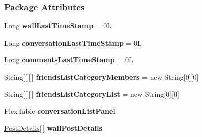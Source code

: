 \subsubsection*{Package Attributes}
\begin{DoxyCompactItemize}
\item 
\hypertarget{classballmerpeak_1_1turtlenet_1_1client_1_1frontend_a0ae0ed364ab749ea18cf1e45d64e1db7}{Long {\bfseries wall\-Last\-Time\-Stamp} = 0\-L}\label{classballmerpeak_1_1turtlenet_1_1client_1_1frontend_a0ae0ed364ab749ea18cf1e45d64e1db7}

\item 
\hypertarget{classballmerpeak_1_1turtlenet_1_1client_1_1frontend_a97ea23587c248a189f579102c29a0fc9}{Long {\bfseries conversation\-Last\-Time\-Stamp} = 0\-L}\label{classballmerpeak_1_1turtlenet_1_1client_1_1frontend_a97ea23587c248a189f579102c29a0fc9}

\item 
\hypertarget{classballmerpeak_1_1turtlenet_1_1client_1_1frontend_a7a4a64b5a06ff541b6a7112f852833b3}{Long {\bfseries comments\-Last\-Time\-Stamp} = 0\-L}\label{classballmerpeak_1_1turtlenet_1_1client_1_1frontend_a7a4a64b5a06ff541b6a7112f852833b3}

\item 
\hypertarget{classballmerpeak_1_1turtlenet_1_1client_1_1frontend_a5f5b375a148f003db1813758020730d6}{String\mbox{[}$\,$\mbox{]}\mbox{[}$\,$\mbox{]} {\bfseries friends\-List\-Category\-Members} = new String\mbox{[}0\mbox{]}\mbox{[}0\mbox{]}}\label{classballmerpeak_1_1turtlenet_1_1client_1_1frontend_a5f5b375a148f003db1813758020730d6}

\item 
\hypertarget{classballmerpeak_1_1turtlenet_1_1client_1_1frontend_af616e8f4d9c96bac48b8f997004cc385}{String\mbox{[}$\,$\mbox{]}\mbox{[}$\,$\mbox{]} {\bfseries friends\-List\-Category\-List} = new String\mbox{[}0\mbox{]}\mbox{[}0\mbox{]}}\label{classballmerpeak_1_1turtlenet_1_1client_1_1frontend_af616e8f4d9c96bac48b8f997004cc385}

\item 
\hypertarget{classballmerpeak_1_1turtlenet_1_1client_1_1frontend_ad41191c45ac70b949585a24904a7f83a}{Flex\-Table {\bfseries conversation\-List\-Panel}}\label{classballmerpeak_1_1turtlenet_1_1client_1_1frontend_ad41191c45ac70b949585a24904a7f83a}

\item 
\hypertarget{classballmerpeak_1_1turtlenet_1_1client_1_1frontend_ad30f8befb0a4b2cf165bc34cf608866a}{\hyperlink{classballmerpeak_1_1turtlenet_1_1shared_1_1PostDetails}{Post\-Details}\mbox{[}$\,$\mbox{]} {\bfseries wall\-Post\-Details}}\label{classballmerpeak_1_1turtlenet_1_1client_1_1frontend_ad30f8befb0a4b2cf165bc34cf608866a}


\end{DoxyCompactItemize}
